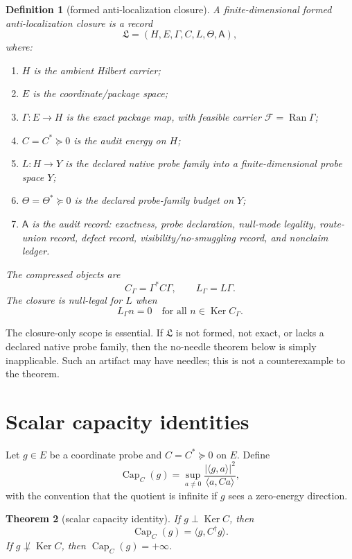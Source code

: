 \documentclass[11pt]{article}
\newtheorem{theorem}{Theorem}[section]
\newtheorem{definition}[theorem]{Definition}
\newcommand{\Capa}{\operatorname{Cap}}
\newcommand{\Ran}{\operatorname{Ran}}
\newcommand{\Ker}{\operatorname{Ker}}
\begin{document}
\begin{definition}[formed anti-localization closure]
A finite-dimensional formed anti-localization closure is a record
\[
\mathfrak L=(H,E,\Gamma,C,L,\Theta,\mathsf A),
\]
where:
\begin{enumerate}[label=(\roman*)]
\item $H$ is the ambient Hilbert carrier;
\item $E$ is the coordinate/package space;
\item $\Gamma:E\to H$ is the exact package map, with feasible carrier $\mathcal F=\Ran\Gamma$;
\item $C=C^*\succeq0$ is the audit energy on $H$;
\item $L:H\to Y$ is the declared native probe family into a finite-dimensional probe space $Y$;
\item $\Theta=\Theta^*\succeq0$ is the declared probe-family budget on $Y$;
\item $\mathsf A$ is the audit record: exactness, probe declaration, null-mode legality, route-union record, defect record, visibility/no-smuggling record, and nonclaim ledger.
\end{enumerate}
The compressed objects are
\[
C_\Gamma=\Gamma^*C\Gamma,
\qquad
L_\Gamma=L\Gamma.
\]
The closure is null-legal for $L$ when
\[
L_\Gamma n=0\quad\text{for all }n\in\Ker C_\Gamma.
\]
\end{definition}

The closure-only scope is essential.  If $\mathfrak L$ is not formed, not exact, or lacks a declared native probe family, then the no-needle theorem below is simply inapplicable.  Such an artifact may have needles; this is not a counterexample to the theorem.

\section{Scalar capacity identities}

Let $g\in E$ be a coordinate probe and $C=C^*\succeq0$ on $E$.  Define
\[
\Capa_C(g)=\sup_{a\ne0}\frac{|\langle g,a\rangle|^2}{\langle a,Ca\rangle},
\]
with the convention that the quotient is infinite if $g$ sees a zero-energy direction.

\begin{theorem}[scalar capacity identity]
If $g\perp\Ker C$, then
\[
\Capa_C(g)=\langle g,C^\dagger g\rangle.
\]
If $g\not\perp\Ker C$, then $\Capa_C(g)=+\infty$.
\end{theorem}
\end{document}
